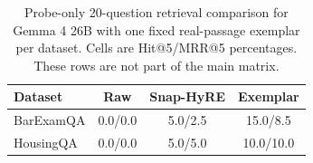 \begin{table}[t]
\centering
\caption{Probe-only 20-question retrieval comparison for Gemma 4 26B with one fixed real-passage exemplar per dataset. Cells are Hit@5/MRR@5 percentages. These rows are not part of the main matrix.}
\label{tab:exemplar_probe}
\scriptsize
\begin{tabular}{lccc}
\toprule
Dataset & Raw & Snap-HyRE & Exemplar \\
\midrule
BarExamQA & 0.0/0.0 & 5.0/2.5 & 15.0/8.5 \\
HousingQA & 0.0/0.0 & 5.0/5.0 & 10.0/10.0 \\
\bottomrule
\end{tabular}
\end{table}
